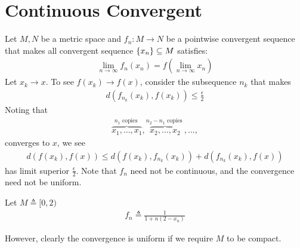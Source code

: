\documentclass{report}
\begin{document}
\section{Continuous Convergent}
Let $M,N$ be a metric space and  $f_n:M \rightarrow N$ be a pointwise convergent sequence that makes all convergent sequence $\left\{ x_n \right\}\subseteq M$ satisfies:
\begin{align*}
\lim_{n\to \infty} f_n(x_n)= f(\lim_{n\to \infty}x_n)
\end{align*}
Let $x_k\rightarrow x$. To see $f(x_k)\rightarrow f(x)$, consider the subsequence $n_k$ that makes 
\begin{align*}
d\left(f_{n_k}(x_k),f(x_k)\right)\leq \frac{\epsilon}{2}
\end{align*}
Noting that 
\begin{align*}
  \overbrace{x_1,\dots ,x_1}^{n_1\text{ copies }},\overbrace{x_2,\dots , x_2}^{n_2-n_1\text{ copies }},\dots ,
\end{align*}
converges to $x$, we see 
 \begin{align*}
d\left(f(x_k),f(x)\right) \leq d\left( f(x_k), f_{n_k}(x_k)\right) + d\left( f_{n_k}(x_k),f(x) \right) 
\end{align*}
has limit superior $\frac{\epsilon}{2}$. Note that $f_n$ need not be continuous, and the convergence need not be uniform. 
\begin{example}
Let $M\triangleq [0,2)$
\begin{align*}
f_n\triangleq  \frac{1}{1+n(2-x_n)}
\end{align*} 
\end{example}
However, clearly the convergence is uniform if we require $M$ to be compact. 
\end{document}
